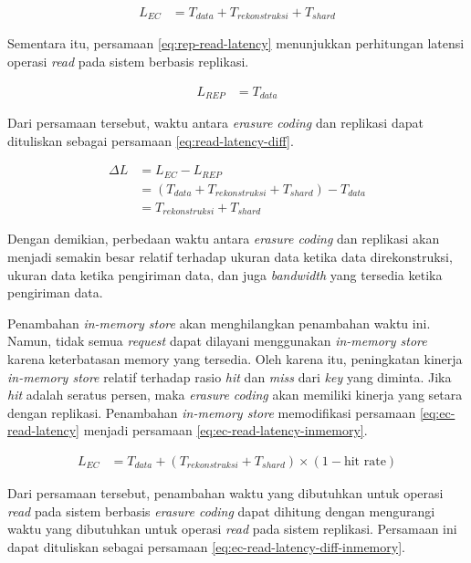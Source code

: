 \begin{enumerate}
  \begin{align}
  L_{EC} &= T_{data} + T_{rekonstruksi} + T_{shard}
  \label{eq:ec-read-latency}
  \end{align}

  Sementara itu, persamaan \ref{eq:rep-read-latency} menunjukkan perhitungan latensi operasi \textit{read} pada sistem berbasis replikasi.

  \begin{align}
  L_{REP} &= T_{data}
  \label{eq:rep-read-latency}
  \end{align}

  Dari persamaan tersebut, waktu antara \textit{erasure coding} dan replikasi dapat dituliskan sebagai persamaan \ref{eq:read-latency-diff}.

  \begin{align}
  \Delta L &= L_{EC} - L_{REP} \\
  &= (T_{data} + T_{rekonstruksi} + T_{shard}) - T_{data} \\
  &= T_{rekonstruksi} + T_{shard}
  \label{eq:read-latency-diff}
  \end{align}

  Dengan demikian, perbedaan waktu antara \textit{erasure coding} dan replikasi akan menjadi semakin besar relatif terhadap ukuran data ketika data direkonstruksi, ukuran data ketika pengiriman data, dan juga \textit{bandwidth} yang tersedia ketika pengiriman data.
  
  Penambahan \textit{in-memory store} akan menghilangkan penambahan waktu ini. Namun, tidak semua \textit{request} dapat dilayani menggunakan \textit{in-memory store} karena keterbatasan memory yang tersedia. Oleh karena itu, peningkatan kinerja \textit{in-memory store} relatif terhadap rasio \textit{hit} dan \textit{miss} dari \textit{key} yang diminta. Jika \textit{hit} adalah seratus persen, maka \textit{erasure coding} akan memiliki kinerja yang setara dengan replikasi. Penambahan \textit{in-memory store} memodifikasi persamaan \ref{eq:ec-read-latency} menjadi persamaan \ref{eq:ec-read-latency-inmemory}.

  \begin{align}
    L_{EC} &= T_{data} + (T_{rekonstruksi} + T_{shard}) \times (1 - \text{hit rate})
    \label{eq:ec-read-latency-inmemory}
  \end{align}

  Dari persamaan tersebut, penambahan waktu yang dibutuhkan untuk operasi \textit{read} pada sistem berbasis \textit{erasure coding} dapat dihitung dengan mengurangi waktu yang dibutuhkan untuk operasi \textit{read} pada sistem replikasi. Persamaan ini dapat dituliskan sebagai persamaan \ref{eq:ec-read-latency-diff-inmemory}.


\end{enumerate}
